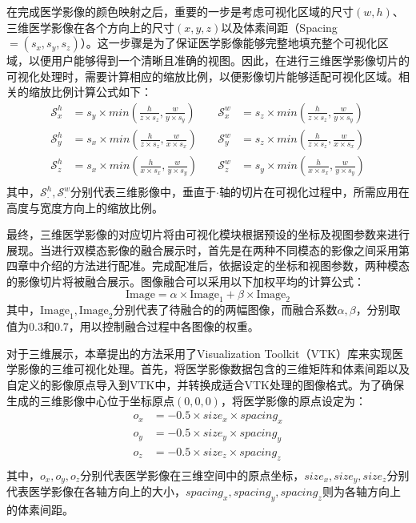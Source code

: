 在完成医学影像的颜色映射之后，重要的一步是考虑可视化区域的尺寸\((w,h)\)、三维医学影像在各个方向上的尺寸\((x,y,z)\)以及体素间距（Spacing\(=(s_x,s_y,s_z)\)）。这一步骤是为了保证医学影像能够完整地填充整个可视化区域，以便用户能够得到一个清晰且准确的视图。因此，在进行三维医学影像切片的可视化处理时，需要计算相应的缩放比例，以便影像切片能够适配可视化区域。相关的缩放比例计算公式如下：
\begin{equation}
  \begin{aligned}
    \mathcal{S}_x^{h} & = s_y \times min(\frac{h}{z \times s_z}, \frac{w}{y \times s_y}) & \quad \mathcal{S}_x^{w} & = s_z \times min(\frac{h}{z \times s_z}, \frac{w}{y \times s_y}) \\
    \mathcal{S}_y^{h} & = s_x \times min(\frac{h}{z \times s_z}, \frac{w}{x \times s_x}) & \quad \mathcal{S}_y^{w} & = s_z \times min(\frac{h}{z \times s_z}, \frac{w}{x \times s_x}) \\
    \mathcal{S}_z^{h} & = s_x \times min(\frac{h}{x \times s_x}, \frac{w}{y \times s_y}) & \quad \mathcal{S}_z^{w} & = s_y \times min(\frac{h}{x \times s_x}, \frac{w}{y \times s_y}) \\
  \end{aligned}
  \label{eq:chap05_scale}
\end{equation}
其中，\(\mathcal{S}_\cdot^{h},\mathcal{S}_\cdot^{w}\)分别代表三维影像中，垂直于\(\cdot\)轴的切片在可视化过程中，所需应用在高度与宽度方向上的缩放比例。

最终，三维医学影像的对应切片将由可视化模块根据预设的坐标及视图参数来进行展现。当进行双模态影像的融合展示时，首先是在两种不同模态的影像之间采用第四章中介绍的方法进行配准。完成配准后，依据设定的坐标和视图参数，两种模态的影像切片将被融合展示。图像融合可以采用以下加权平均的计算公式：
\begin{equation}
  \text{Image} = \alpha \times \text{Image}_1 + \beta \times \text{Image}_2
  \label{eq:chap05_fusion}
\end{equation}
其中，\(\text{Image}_1,\text{Image}_2\)分别代表了待融合的的两幅图像，而融合系数\(\alpha, \beta\)，分别取值为0.3和0.7，用以控制融合过程中各图像的权重。

对于三维展示，本章提出的方法采用了Visualization Toolkit（VTK）库来实现医学影像的三维可视化处理。首先，将医学影像数据包含的三维矩阵和体素间距以及自定义的影像原点导入到VTK中，并转换成适合VTK处理的图像格式。为了确保生成的三维影像中心位于坐标原点\((0,0,0)\)，将医学影像的原点设定为：
\begin{equation}
  \begin{aligned}
    o_x & = -0.5 \times size_x \times spacing_x \\
    o_y & = -0.5 \times size_y \times spacing_y \\
    o_z & = -0.5 \times size_z \times spacing_z \\
  \end{aligned}
\end{equation}
其中，\(o_x,o_y,o_z\)分别代表医学影像在三维空间中的原点坐标，\(size_x,size_y,size_z\)分别代表医学影像在各轴方向上的大小，\(spacing_x,spacing_y,spacing_z\)则为各轴方向上的体素间距。

